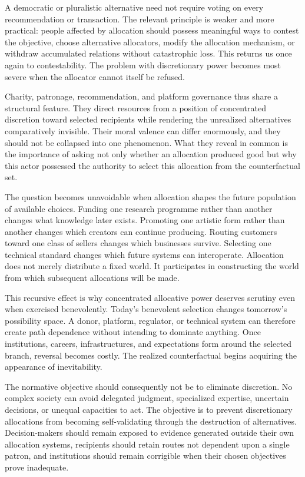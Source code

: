 \documentclass[11pt]{article}
\begin{document}
A democratic or pluralistic alternative need not require voting on every recommendation or transaction. The relevant principle is weaker and more practical: people affected by allocation should possess meaningful ways to contest the objective, choose alternative allocators, modify the allocation mechanism, or withdraw accumulated relations without catastrophic loss. This returns us once again to contestability. The problem with discretionary power becomes most severe when the allocator cannot itself be refused.

Charity, patronage, recommendation, and platform governance thus share a structural feature. They direct resources from a position of concentrated discretion toward selected recipients while rendering the unrealized alternatives comparatively invisible. Their moral valence can differ enormously, and they should not be collapsed into one phenomenon. What they reveal in common is the importance of asking not only whether an allocation produced good but why this actor possessed the authority to select this allocation from the counterfactual set.

The question becomes unavoidable when allocation shapes the future population of available choices. Funding one research programme rather than another changes what knowledge later exists. Promoting one artistic form rather than another changes which creators can continue producing. Routing customers toward one class of sellers changes which businesses survive. Selecting one technical standard changes which future systems can interoperate. Allocation does not merely distribute a fixed world. It participates in constructing the world from which subsequent allocations will be made.

This recursive effect is why concentrated allocative power deserves scrutiny even when exercised benevolently. Today's benevolent selection changes tomorrow's possibility space. A donor, platform, regulator, or technical system can therefore create path dependence without intending to dominate anything. Once institutions, careers, infrastructures, and expectations form around the selected branch, reversal becomes costly. The realized counterfactual begins acquiring the appearance of inevitability.

The normative objective should consequently not be to eliminate discretion. No complex society can avoid delegated judgment, specialized expertise, uncertain decisions, or unequal capacities to act. The objective is to prevent discretionary allocations from becoming self-validating through the destruction of alternatives. Decision-makers should remain exposed to evidence generated outside their own allocation systems, recipients should retain routes not dependent upon a single patron, and institutions should remain corrigible when their chosen objectives prove inadequate.
\end{document}

